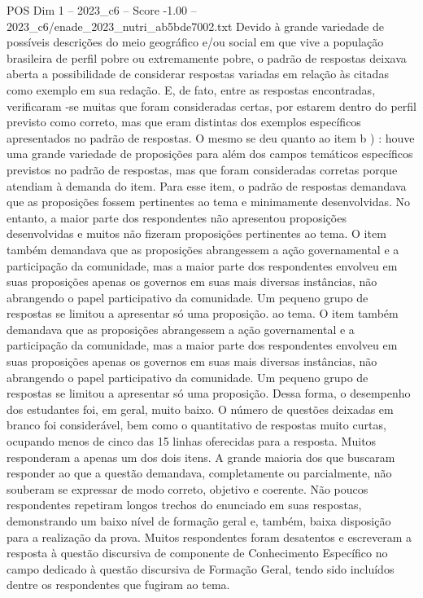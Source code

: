 \begin{textsample}{POS Dim 1 – 2023\_c6 – Score -1.00 – 2023\_c6/enade\_2023\_nutri\_ab5bde7002.txt}
Devido à grande variedade de possíveis descrições do meio geográfico e/ou social em que vive a população brasileira de perfil pobre ou extremamente pobre, o padrão de respostas deixava aberta a possibilidade de considerar respostas variadas em relação às citadas como exemplo em sua redação.
E, de fato, entre as respostas encontradas, verificaram -se muitas que foram consideradas certas, por estarem dentro do perfil previsto como correto, mas que eram distintas dos exemplos específicos apresentados no padrão de respostas.
O mesmo se deu quanto ao item b ) : houve uma grande variedade de proposições para além dos campos temáticos específicos previstos no padrão de respostas, mas que foram consideradas corretas porque atendiam à demanda do item.
Para esse item, o padrão de respostas demandava que as proposições fossem pertinentes ao tema e minimamente desenvolvidas.
No entanto, a maior parte dos respondentes não apresentou proposições desenvolvidas e muitos não fizeram proposições pertinentes ao tema.
O item também demandava que as proposições abrangessem a ação governamental e a participação da comunidade, mas a maior parte dos respondentes envolveu em suas proposições apenas os governos em suas mais diversas instâncias, não abrangendo o papel participativo da comunidade.
Um pequeno grupo de respostas se limitou a apresentar só uma proposição. ao tema.
O item também demandava que as proposições abrangessem a ação governamental e a participação da comunidade, mas a maior parte dos respondentes envolveu em suas proposições apenas os governos em suas mais diversas instâncias, não abrangendo o papel participativo da comunidade.
Um pequeno grupo de respostas se limitou a apresentar só uma proposição.
Dessa forma, o desempenho dos estudantes foi, em geral, muito baixo.
O número de questões deixadas em branco foi considerável, bem como o quantitativo de respostas muito curtas, ocupando menos de cinco das 15 linhas oferecidas para a resposta.
Muitos responderam a apenas um dos dois itens.
A grande maioria dos que buscaram responder ao que a questão demandava, completamente ou parcialmente, não souberam se expressar de modo correto, objetivo e coerente.
Não poucos respondentes repetiram longos trechos do enunciado em suas respostas, demonstrando um baixo nível de formação geral e, também, baixa disposição para a realização da prova.
Muitos respondentes foram desatentos e escreveram a resposta à questão discursiva de componente de Conhecimento Específico no campo dedicado à questão discursiva de Formação Geral, tendo sido incluídos dentre os respondentes que fugiram ao tema.

\end{textsample}
